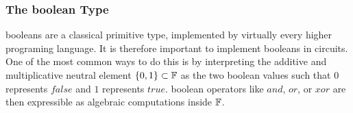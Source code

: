 \begin{comment}
To synthesize the associated circuit, we start with the twisted Edwards addition law XXX\sme{add reference} of the tiny jubjub curve:
$$
(x,y) = \left(\frac{x_1y_2+y_1x_2}{1+8x_1y_1x_2y_2}, \frac{y_1y_2-3x_1x_2}{1-8x_1y_1x_2y_2} \right)
$$ 
To transformation this expression into a circuit we rewrite it in terms of the binary operators $ADD$, $SUB$, $MUL$, $DIV$ that represent the four fundamental field operations in $\F_{13}$. We get
\begin{align*}
(x,y) & = (\\
  & \scriptstyle DIV(ADD(MUL(x_1,y_2),MUL(y_1,x_2)),
         ADD(1,MUL(8,MUL(MUL(x_1,y_1),MUL(x_2,y_2))))), \\   
  & \scriptstyle DIV(ADD(MUL(y_1,y_2),MUL(MUL(3,x_1),x_2)),
         ADD(1,MUL(8,MUL(MUL(x_1,y_1),MUL(x_2,y_2)))))\\
  & )
\end{align*}
We then proceed inductively choosing circuits for the outer most operators, which in this case are two division circuits. We don't expand their inputs into circuits yet, but only represent the inputs symbolically. For better readability we use the symbols of the next operator only, because otherwise the circuit becomes unreadable. We get:
\begin{center}
\digraph[scale=0.4]{TEA}{
	forcelabels=true;
	center=true;
	splines=ortho;
	nodesep= 2.0;
	// x-value
	nx1 -> nx6 [xlabel="Ex_1  "];
	nx2 -> nx4 [xlabel="Ex_2  "];
	nx3 -> nx6 [xlabel="Ex_3  "];
	nx3 -> nx4 [xlabel="Ex_3  "];
	nx4 -> nx5 [xlabel="Ex_4  "];
	nx6 -> nx7 [xlabel="Ex_5  "];
	nx1 [shape=box, label="ADD(.,.)"];
	nx2 [shape=box, label="ADD(.,.)"];
	nx3 [shape=box, label="ADD(.,.)_INV"];
	nx4 [label="*"];	
	nx5 [shape=box, label="1"];
	nx6 [label="*"];	
	nx7 [shape=box, label="DIV(ADD(.,.),ADD(.,.))"];
	// y-value
	ny1 -> ny6 [xlabel="Ey_1  "];
	ny2 -> ny4 [xlabel="Ey_2  "];
	ny3 -> ny6 [xlabel="Ey_3  "];
	ny3 -> ny4 [xlabel="Ey_3  "];
	ny4 -> ny5 [xlabel="Ey_4  "];
	ny6 -> ny7 [xlabel="Ey_5  "];
	ny1 [shape=box, label="ADD(.,.)"];
	ny2 [shape=box, label="ADD(.,.)"];
	ny3 [shape=box, label="ADD(.,.)_INV"];
	ny4 [label="*"];	
	ny5 [shape=box, label="1"];
	ny6 [label="*"];	
	ny7 [shape=box, label="DIV(ADD(.,.),ADD(.,.))"];	
}
\end{center}

\end{example}
\end{comment}

\subsubsection{The boolean Type} 
booleans are a classical primitive type, implemented by virtually every higher programing language. It is therefore important to implement booleans in circuits. One of the most common ways to do this is by interpreting the additive and multiplicative neutral element $\{0,1\}\subset \mathbb{F}$ as the two boolean values such that $0$ represents $false$ and $1$ represents $true$. boolean operators like $and$, $or$, or $xor$ are then expressible as algebraic computations inside $\mathbb{F}$. 

